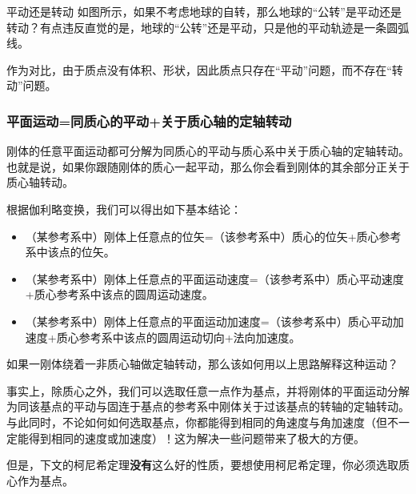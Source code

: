 \begin{example}{平动还是转动}
如图所示，如果不考虑地球的自转，那么地球的“公转”是平动还是转动？有点违反直觉的是，地球的“公转”还是平动，只是他的平动轨迹是一条圆弧线。
\end{example}
作为对比，由于质点没有体积、形状，因此质点只存在“平动”问题，而不存在“转动”问题。

\subsubsection{平面运动=同质心的平动+关于质心轴的定轴转动}
刚体的任意平面运动都可分解为同质心的平动与质心系中关于质心轴的定轴转动。也就是说，如果你跟随刚体的质心一起平动，那么你会看到刚体的其余部分正关于质心轴转动。

根据伽利略变换，我们可以得出如下基本结论：
\begin{itemize}
\item （某参考系中）刚体上任意点的位矢=（该参考系中）质心的位矢+质心参考系中该点的位矢。
\item （某参考系中）刚体上任意点的平面运动速度=（该参考系中）质心平动速度+质心参考系中该点的圆周运动速度。
\item （某参考系中）刚体上任意点的平面运动加速度=（该参考系中）质心平动加速度+质心参考系中该点的圆周运动切向+法向加速度。
\end{itemize}

\begin{exercise}{}
如果一刚体绕着一非质心轴做定轴转动，那么该如何用以上思路解释这种运动？
\end{exercise}

事实上，除质心之外，我们可以选取任意一点作为基点，并将刚体的平面运动分解为同该基点的平动与固连于基点的参考系中刚体关于过该基点的转轴的定轴转动。与此同时，不论如何如何选取基点，你都能得到相同的角速度与角加速度（但不一定能得到相同的速度或加速度）！这为解决一些问题带来了极大的方便。

但是，下文的柯尼希定理\textbf{没有}这么好的性质，要想使用柯尼希定理，你必须选取质心作为基点。

